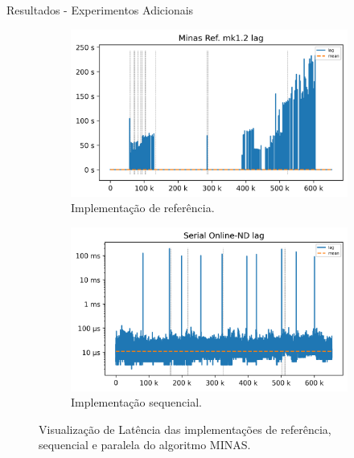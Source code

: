 \documentclass[aspectratio=1610,10pt]{beamer}
\newcommand{\minas}{MINAS\xspace}
\begin{document}
\begin{frame}{Resultados - Experimentos Adicionais}
    \begin{figure}[h]
      \centering
      \begin{subfigure}{0.49\textwidth}
        \centering
        \includegraphics[width=1\linewidth]{experiments/lag-java.png}
        \caption{Implementação de referência.}
        \label{fig:lag-java}
      \end{subfigure}
      \hfill
      \begin{subfigure}{0.49\textwidth}
        \centering
        \includegraphics[width=1\linewidth]{experiments/lag-serial.png}
        \caption{Implementação sequencial.}
        \label{fig:lag-serial}
      \end{subfigure}
      \caption{Visualização de Latência das implementações de referência, sequencial
      e paralela do algoritmo \minas.}
      \label{fig:lag}
    \end{figure}
\end{frame}
\end{document}
